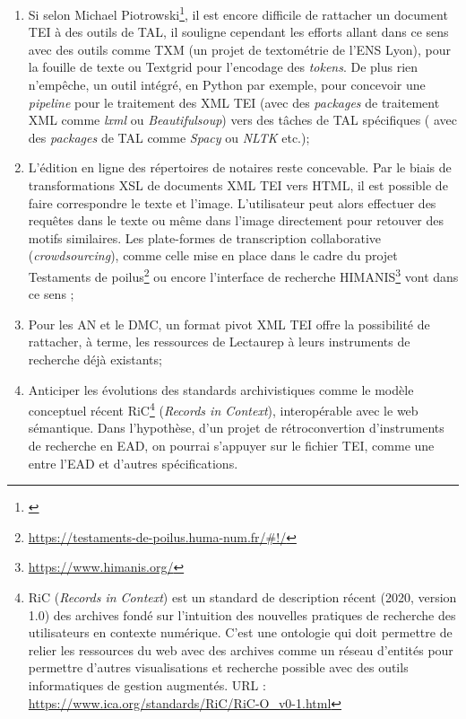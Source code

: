 \begin{enumerate}
    \item Si selon Michael Piotrowski\footnote{\cite{romary_natural_2014}}, il est encore difficile de rattacher un document TEI à des outils de TAL, il souligne cependant les efforts allant dans ce sens avec des outils comme TXM (un projet de textométrie de l'ENS Lyon), pour la fouille de texte ou Textgrid pour l'encodage des \textit{tokens}. De plus rien n'empêche, un outil intégré, en Python par exemple, pour concevoir une \textit{pipeline} pour le traitement des XML TEI (avec des \textit{packages} de traitement XML comme \textit{lxml} ou \textit{Beautifulsoup}) vers des tâches de TAL spécifiques ( avec des \textit{packages} de TAL comme \textit{Spacy} ou \textit{NLTK} etc.);\\
    \item L'édition en ligne des répertoires de notaires reste concevable. Par le biais de transformations XSL de documents XML TEI vers HTML, il est possible de faire correspondre le texte et l'image. L'utilisateur peut alors effectuer des requêtes dans le texte ou même dans l'image directement pour retouver des motifs similaires.  Les plate-formes de transcription collaborative (\textit{crowdsourcing}), comme celle mise en place dans le cadre du projet Testaments de poilus\footnote{\url{https://testaments-de-poilus.huma-num.fr/\#!/}} ou encore l'interface de recherche HIMANIS\footnote{\url{https://www.himanis.org/}} vont dans ce sens ;\\
    \item Pour les AN et le DMC, un format pivot XML TEI offre la possibilité de rattacher, à terme, les ressources de Lectaurep à leurs instruments de recherche déjà existants;
    \item Anticiper les évolutions des standards archivistiques comme le modèle conceptuel récent RiC\footnote{RiC (\textit{Records in Context}) est un standard de description récent (2020, version 1.0) des archives fondé sur l'intuition des nouvelles pratiques de recherche des utilisateurs en contexte numérique. C'est une ontologie qui doit permettre de relier les ressources du web avec des archives comme un réseau d'entités pour permettre d'autres visualisations et recherche possible avec des outils informatiques de gestion augmentés. URL : \url{https://www.ica.org/standards/RiC/RiC-O_v0-1.html}} (\textit{Records in Context}), interopérable avec le web sémantique. Dans l'hypothèse, d'un projet de rétroconvertion d'instruments de recherche en EAD, on pourrai s'appuyer sur le fichier TEI, comme une  entre l'EAD et d'autres spécifications.
\end{enumerate}

